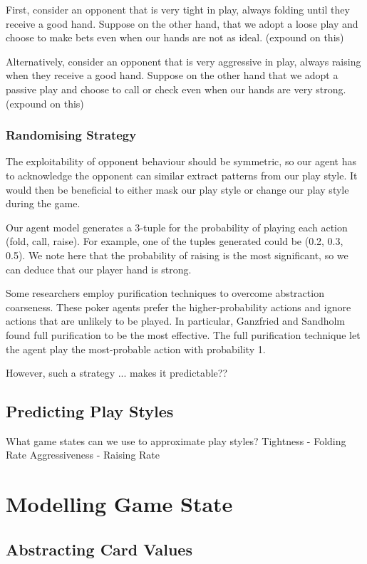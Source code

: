 \documentclass{article}
\begin{document}
First, consider an opponent that is very tight in play, always folding until they receive a good hand. Suppose on the other hand, that we adopt a loose play and choose to make bets even when our hands are not as ideal. (expound on this)

Alternatively, consider an opponent that is very aggressive in play, always raising when they receive a good hand. Suppose on the other hand that we adopt a passive play and choose to call or check even when our hands are very strong. (expound on this)

\subsubsection{Randomising Strategy}

The exploitability of opponent behaviour should be symmetric, so our agent has to acknowledge the opponent can similar extract patterns from our play style. It would then be beneficial to either mask our play style or change our play style during the game.

Our agent model generates a 3-tuple for the probability of playing each action (fold, call, raise). For example, one of the tuples generated could be (0.2, 0.3, 0.5). We note here that the probability of raising is the most significant, so we can deduce that our player hand is strong.

Some researchers employ purification techniques to overcome abstraction coarseness. These poker agents prefer the higher-probability actions and ignore actions that are unlikely to be played. In particular, Ganzfried and Sandholm found full purification to be the most effective. The full purification technique let the agent play the most-probable action with probability 1.

However, such a strategy ... makes it predictable??

\subsection{Predicting Play Styles}

What game states can we use to approximate play styles?
Tightness - Folding Rate
Aggressiveness - Raising Rate

\section{Modelling Game State}

\subsection{Abstracting Card Values}
\end{document}
